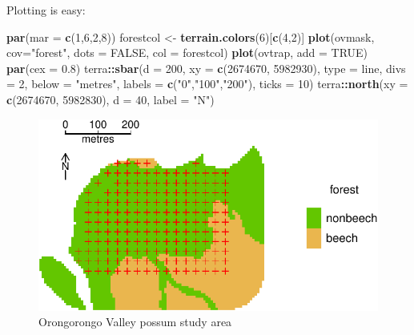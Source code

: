 \documentclass[
]{book}
\newenvironment{Shaded}{\begin{snugshade}}{\end{snugshade}}
\newcommand{\AttributeTok}[1]{\textcolor[rgb]{0.13,0.29,0.53}{#1}}
\newcommand{\ConstantTok}[1]{\textcolor[rgb]{0.56,0.35,0.01}{#1}}
\newcommand{\DecValTok}[1]{\textcolor[rgb]{0.00,0.00,0.81}{#1}}
\newcommand{\FloatTok}[1]{\textcolor[rgb]{0.00,0.00,0.81}{#1}}
\newcommand{\FunctionTok}[1]{\textcolor[rgb]{0.13,0.29,0.53}{\textbf{#1}}}
\newcommand{\NormalTok}[1]{#1}
\newcommand{\OtherTok}[1]{\textcolor[rgb]{0.56,0.35,0.01}{#1}}
\newcommand{\SpecialCharTok}[1]{\textcolor[rgb]{0.81,0.36,0.00}{\textbf{#1}}}
\newcommand{\StringTok}[1]{\textcolor[rgb]{0.31,0.60,0.02}{#1}}
\begin{document}
Plotting is easy:

\begin{Shaded}
\begin{Highlighting}[]
\FunctionTok{par}\NormalTok{(}\AttributeTok{mar =} \FunctionTok{c}\NormalTok{(}\DecValTok{1}\NormalTok{,}\DecValTok{6}\NormalTok{,}\DecValTok{2}\NormalTok{,}\DecValTok{8}\NormalTok{))}
\NormalTok{forestcol }\OtherTok{\textless{}{-}} \FunctionTok{terrain.colors}\NormalTok{(}\DecValTok{6}\NormalTok{)[}\FunctionTok{c}\NormalTok{(}\DecValTok{4}\NormalTok{,}\DecValTok{2}\NormalTok{)]}
\FunctionTok{plot}\NormalTok{(ovmask, }\AttributeTok{cov=}\StringTok{"forest"}\NormalTok{, }\AttributeTok{dots =} \ConstantTok{FALSE}\NormalTok{, }\AttributeTok{col =}\NormalTok{ forestcol)}
\FunctionTok{plot}\NormalTok{(ovtrap, }\AttributeTok{add =} \ConstantTok{TRUE}\NormalTok{)}
\FunctionTok{par}\NormalTok{(}\AttributeTok{cex =} \FloatTok{0.8}\NormalTok{)}
\NormalTok{terra}\SpecialCharTok{::}\FunctionTok{sbar}\NormalTok{(}\AttributeTok{d =} \DecValTok{200}\NormalTok{, }\AttributeTok{xy =} \FunctionTok{c}\NormalTok{(}\DecValTok{2674670}\NormalTok{, }\DecValTok{5982930}\NormalTok{), }\AttributeTok{type =} \StringTok{\textquotesingle{}line\textquotesingle{}}\NormalTok{, }
    \AttributeTok{divs =} \DecValTok{2}\NormalTok{, }\AttributeTok{below =} \StringTok{"metres"}\NormalTok{, }\AttributeTok{labels =} \FunctionTok{c}\NormalTok{(}\StringTok{"0"}\NormalTok{,}\StringTok{"100"}\NormalTok{,}\StringTok{"200"}\NormalTok{), }
    \AttributeTok{ticks =} \DecValTok{10}\NormalTok{)}
\NormalTok{terra}\SpecialCharTok{::}\FunctionTok{north}\NormalTok{(}\AttributeTok{xy =} \FunctionTok{c}\NormalTok{(}\DecValTok{2674670}\NormalTok{, }\DecValTok{5982830}\NormalTok{), }\AttributeTok{d =} \DecValTok{40}\NormalTok{, }\AttributeTok{label =} \StringTok{"N"}\NormalTok{)}
\end{Highlighting}
\end{Shaded}

\begin{figure}
\includegraphics[width=0.95\linewidth]{SECRbook_files/figure-latex/ovmaskplot-1} \caption{Orongorongo Valley possum study area}\label{fig:ovmaskplot}
\end{figure}
\end{document}

